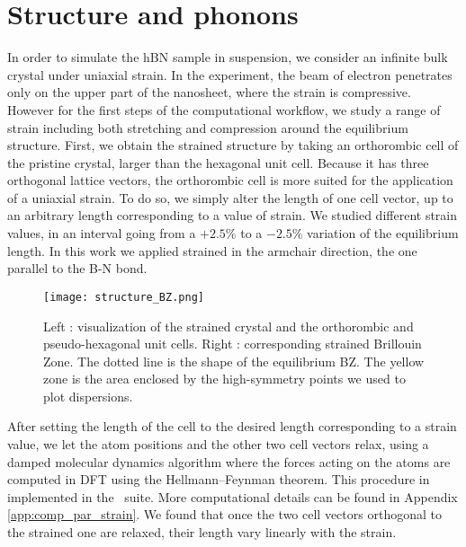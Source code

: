 \section{Structure and phonons}
In order to simulate the hBN sample in suspension, we consider an infinite bulk crystal under uniaxial strain. In the experiment, the beam of electron penetrates only on the upper part of the nanosheet, where the strain is compressive. However for the first steps of the computational workflow, we study a range of strain including both stretching and compression around the equilibrium structure.
First, we obtain the strained structure by taking an orthorombic cell of the pristine crystal, larger than the hexagonal unit cell. Because it has three orthogonal lattice vectors, the orthorombic cell is more suited for the application of a uniaxial strain. To do so, we simply alter the length of one cell vector, up to an arbitrary length corresponding to a value of strain. We studied different strain values, in an interval going from a $+2.5\%$ to a $-2.5\%$ variation of the equilibrium length. In this work we applied strained in the armchair direction, the one parallel to the B-N bond. 
\begin{figure}[tbp]
	\vspace{0.5cm}
	\setcapindent{2em}
	\centering
	\texttt{[image: structure\_BZ.png]}
	\caption{Left : visualization of the strained crystal and the orthorombic and pseudo-hexagonal unit cells. Right : corresponding strained Brillouin Zone. The dotted line is the shape of the equilibrium BZ. The yellow zone is the area enclosed by the high-symmetry points we used to plot dispersions.}
	\label{fig:strain_BZ}
\end{figure}
After setting the length of the cell to the desired length corresponding to a strain value, we let the atom positions and the other two cell vectors relax, using a damped molecular dynamics algorithm where the forces acting on the atoms are computed in \acrshort{DFT} using the Hellmann--Feynman theorem. This procedure in implemented in the \qe ~suite.\cite{giannozzi2009quantum,giannozzi2017advanced} More computational details can be found in Appendix \ref{app:comp_par_strain}. We found that once the two cell vectors orthogonal to the strained one are relaxed, their length vary linearly with the strain.

